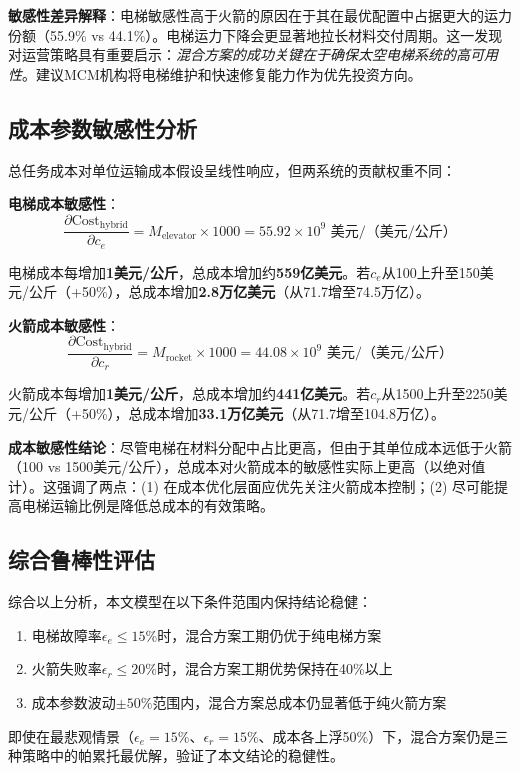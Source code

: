 \textbf{敏感性差异解释}：电梯敏感性高于火箭的原因在于其在最优配置中占据更大的运力份额（55.9\% vs 44.1\%）。电梯运力下降会更显著地拉长材料交付周期。这一发现对运营策略具有重要启示：\textit{混合方案的成功关键在于确保太空电梯系统的高可用性}。建议MCM机构将电梯维护和快速修复能力作为优先投资方向。

\subsection{成本参数敏感性分析}

总任务成本对单位运输成本假设呈线性响应，但两系统的贡献权重不同：

\textbf{电梯成本敏感性}：
\begin{equation}
    \frac{\partial \text{Cost}_{\text{hybrid}}}{\partial c_e} = M_{\text{elevator}} \times 1000 = 55.92 \times 10^9 \text{ 美元/（美元/公斤）}
\end{equation}

电梯成本每增加\textbf{1美元/公斤}，总成本增加约\textbf{559亿美元}。若$c_e$从100上升至150美元/公斤（+50\%），总成本增加\textbf{2.8万亿美元}（从71.7增至74.5万亿）。

\textbf{火箭成本敏感性}：
\begin{equation}
    \frac{\partial \text{Cost}_{\text{hybrid}}}{\partial c_r} = M_{\text{rocket}} \times 1000 = 44.08 \times 10^9 \text{ 美元/（美元/公斤）}
\end{equation}

火箭成本每增加\textbf{1美元/公斤}，总成本增加约\textbf{441亿美元}。若$c_r$从1500上升至2250美元/公斤（+50\%），总成本增加\textbf{33.1万亿美元}（从71.7增至104.8万亿）。

\textbf{成本敏感性结论}：尽管电梯在材料分配中占比更高，但由于其单位成本远低于火箭（100 vs 1500美元/公斤），总成本对火箭成本的敏感性实际上更高（以绝对值计）。这强调了两点：(1) 在成本优化层面应优先关注火箭成本控制；(2) 尽可能提高电梯运输比例是降低总成本的有效策略。

\subsection{综合鲁棒性评估}

综合以上分析，本文模型在以下条件范围内保持结论稳健：
\begin{enumerate}
    \item 电梯故障率$\epsilon_e \leq 15\%$时，混合方案工期仍优于纯电梯方案
    \item 火箭失败率$\epsilon_r \leq 20\%$时，混合方案工期优势保持在40\%以上
    \item 成本参数波动$\pm 50\%$范围内，混合方案总成本仍显著低于纯火箭方案
\end{enumerate}

即使在最悲观情景（$\epsilon_e=15\%$、$\epsilon_r=15\%$、成本各上浮50\%）下，混合方案仍是三种策略中的帕累托最优解，验证了本文结论的稳健性。
